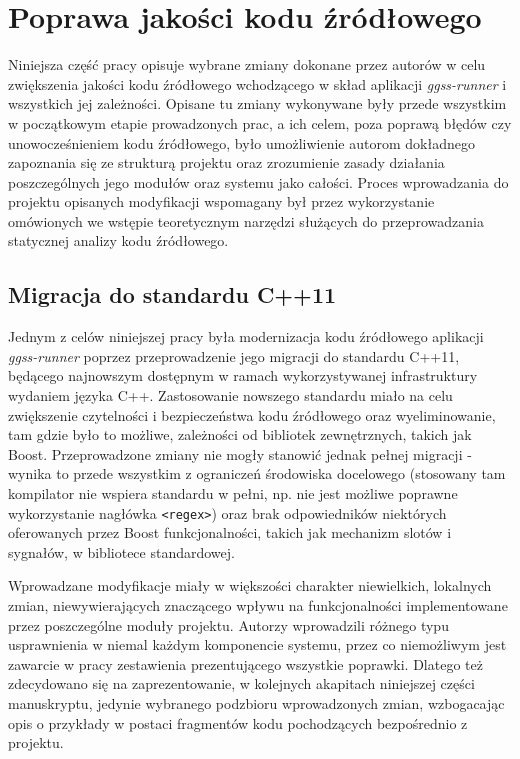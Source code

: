\section{Poprawa jakości kodu źródłowego}
Niniejsza część pracy opisuje wybrane zmiany dokonane przez autorów w celu zwiększenia jakości kodu źródłowego wchodzącego w skład aplikacji \emph{ggss-runner} i wszystkich jej zależności. Opisane tu zmiany wykonywane były przede wszystkim w początkowym etapie prowadzonych prac, a ich celem, poza poprawą błędów czy unowocześnieniem kodu źródłowego, było umożliwienie autorom dokładnego zapoznania się ze strukturą projektu oraz zrozumienie zasady działania poszczególnych jego modułów oraz systemu jako całości. Proces wprowadzania do projektu opisanych modyfikacji wspomagany był przez wykorzystanie omówionych we wstępie teoretycznym narzędzi służących do przeprowadzania statycznej analizy kodu źródłowego. 

\subsection{Migracja do standardu C++11}
Jednym z celów niniejszej pracy była modernizacja kodu źródłowego aplikacji \emph{ggss-runner} poprzez przeprowadzenie jego migracji do standardu C++11, będącego najnowszym dostępnym w ramach wykorzystywanej infrastruktury wydaniem języka C++. Zastosowanie nowszego standardu miało na celu zwiększenie czytelności i bezpieczeństwa kodu źródłowego oraz wyeliminowanie, tam gdzie było to możliwe, zależności od bibliotek zewnętrznych, takich jak Boost. Przeprowadzone zmiany nie mogły stanowić jednak pełnej migracji - wynika to przede wszystkim z ograniczeń środowiska docelowego (stosowany tam kompilator nie wspiera standardu w pełni, np. nie jest możliwe poprawne wykorzystanie nagłówka \lstinline{<regex>}) oraz brak odpowiedników niektórych oferowanych przez Boost funkcjonalności, takich jak mechanizm slotów i sygnałów, w bibliotece standardowej.

Wprowadzane modyfikacje miały w większości charakter niewielkich, lokalnych zmian, niewywierających znaczącego wpływu na funkcjonalności implementowane przez poszczególne moduły projektu. Autorzy wprowadzili różnego typu usprawnienia w niemal każdym komponencie systemu, przez co niemożliwym jest zawarcie w pracy zestawienia prezentującego wszystkie poprawki. Dlatego też zdecydowano się na zaprezentowanie, w kolejnych akapitach niniejszej części manuskryptu, jedynie wybranego podzbioru wprowadzonych zmian, wzbogacając opis o przykłady w postaci fragmentów kodu pochodzących bezpośrednio z projektu. 

